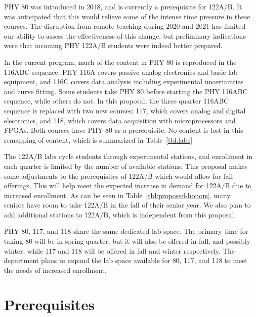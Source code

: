 \documentclass[12pt]{article}
\begin{document}
PHY 80 was introduced in 2018, and is currently a prerequisite for
122A/B.  It was anticipated that this would relieve some of the
intense time pressure in these courses.  The disruption from remote
teaching during 2020 and 2021 has limited our ability to assess the
effectiveness of this change, but preliminary indications were that
incoming PHY 122A/B students were indeed better prepared.

In the current program, much of the content in PHY 80 is reproduced in
the 116ABC sequence. PHY 116A covers passive analog electronics and
basic lab equipment, and 116C covers data analysis including
experimental uncertainties and curve fitting.  Some students take PHY
80 before starting the PHY 116ABC sequence, while others do not. In
this proposal, the three quarter 116ABC sequence is replaced with two
new courses: 117, which covers analog and digital electronics, and
118, which covers data acquisition with microprocessors and FPGAs.
Both courses have PHY 80 as a prerequisite.  No content is lost in
this remapping of content, which is summarized in Table~\ref{tbl:labs}

The 122A/B labs cycle students through experimental stations, and
enrollment in each quarter is limited by the number of available
stations.  This proposal makes some adjustments to the prerequisites
of 122A/B which would allow for fall offerings.  This will help meet
the expected increase in demand for 122A/B due to increased
enrollment.  As can be seen in Table~\ref{tbl:proposed-honors}, many
seniors have room to take 122A/B in the fall of their senior year.  We
also plan to add additional stations to 122A/B, which is independent
from this proposal.

PHY 80, 117, and 118 share the same dedicated lab space.  The primary
time for taking 80 will be in spring quarter, but it will also be
offered in fall, and possibly winter, while 117 and 118 will be
offered in fall and winter respectively.  The department plans to
expand the lab space available for 80, 117, and 118 to meet the needs
of increased enrollment.

\section{Prerequisites}
\end{document}
